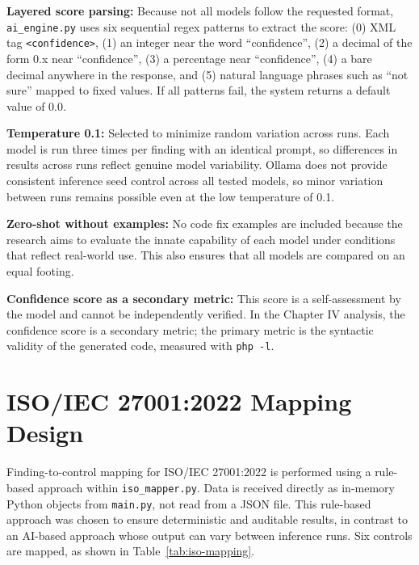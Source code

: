 \textbf{Layered score parsing:} Because not all models follow the requested format, \texttt{ai\_engine.py} uses six sequential regex patterns to extract the score: (0) XML tag \texttt{<confidence>}, (1) an integer near the word ``confidence'', (2) a decimal of the form 0.x near ``confidence'', (3) a percentage near ``confidence'', (4) a bare decimal anywhere in the response, and (5) natural language phrases such as ``not sure'' mapped to fixed values. If all patterns fail, the system returns a default value of 0.0.

\textbf{Temperature 0.1:} Selected to minimize random variation across runs. Each model is run three times per finding with an identical prompt, so differences in results across runs reflect genuine model variability. Ollama does not provide consistent inference seed control across all tested models, so minor variation between runs remains possible even at the low temperature of 0.1.

\textbf{Zero-shot without examples:} No code fix examples are included because the research aims to evaluate the innate capability of each model under conditions that reflect real-world use. This also ensures that all models are compared on an equal footing.

\textbf{Confidence score as a secondary metric:} This score is a self-assessment by the model and cannot be independently verified. In the Chapter IV analysis, the confidence score is a secondary metric; the primary metric is the syntactic validity of the generated code, measured with \texttt{php -l}.

\section{ISO/IEC 27001:2022 Mapping Design}
\label{sec:iso-mapping-design}

\begin{sloppypar}

Finding-to-control mapping for ISO/IEC 27001:2022 is performed using a rule-based approach within \texttt{iso\_mapper.py}. Data is received directly as in-memory Python objects from \texttt{main.py}, not read from a JSON file. This rule-based approach was chosen to ensure deterministic and auditable results, in contrast to an AI-based approach whose output can vary between inference runs. Six controls are mapped, as shown in Table~\ref{tab:iso-mapping}.

\end{sloppypar}

